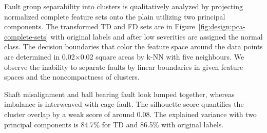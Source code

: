 Fault group separability into clusters is qualitatively analyzed by projecting normalized complete feature sets onto the plain utilizing two principal components. The transformed TD and FD sets are in Figure~\ref{fig:design:pca-complete-sets} with original labels and after low severities are assigned the normal class. The decision boundaries that color the feature space around the data points are determined in 0.02$\times$0.02 square areas by k-NN with five neighbours. We observe the inability to separate faults by linear boundaries in given feature spaces and the noncompactness of clusters.

Shaft misalignment and ball bearing fault look lumped together, whereas imbalance is interweaved with cage fault. The silhouette score quantifies the cluster overlap by a weak score of around 0.08. The explained variance with two principal components is 84.7\% for TD and 86.5\% with original labels.


